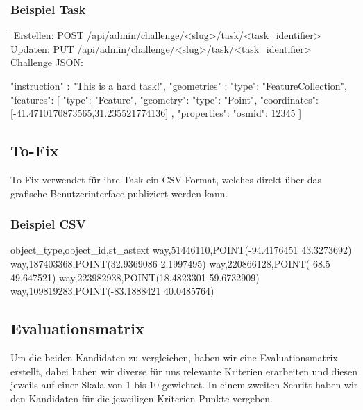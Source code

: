 \subsubsection{Beispiel Task}
\begin{tabbing}
    \hspace*{4cm}\=\hspace*{5cm}\= \kill
    Erstellen: \> POST /api/admin/challenge/<slug>/task/<task\_identifier> \\
    Updaten: \> PUT /api/admin/challenge/<slug>/task/<task\_identifier> \\
    Challenge JSON: \\
\end{tabbing}
\begin{python}
{ 
  "instruction" : "This is a hard task!",
  "geometries" : {
    "type": "FeatureCollection",
    "features": [
      { "type": "Feature",
        "geometry": 
        { "type": "Point", 
          "coordinates":[-41.4710170873565,31.235521774136]
        },
        "properties": {"osmid": 12345}
      }
    ]
  }
}
\end{python}	

\subsection{To-Fix}
To-Fix verwendet für ihre Task ein CSV Format, welches direkt über das grafische Benutzerinterface publiziert werden kann.
\subsubsection{Beispiel CSV}
\begin{python}
object_type,object_id,st_astext
way,51446110,POINT(-94.4176451 43.3273692)
way,187403368,POINT(32.9369086 2.1997495)
way,220866128,POINT(-68.5 49.647521)
way,223982938,POINT(18.4823301 59.6732909)
way,109819283,POINT(-83.1888421 40.0485764)
\end{python}

\newpage

\subsection{Evaluationsmatrix}
Um die beiden Kandidaten zu vergleichen, haben wir eine Evaluationsmatrix erstellt, dabei haben wir diverse für uns relevante Kriterien erarbeiten und diesen jeweils auf einer Skala von 1 bis 10 gewichtet.
In einem zweiten Schritt haben wir den Kandidaten für die jeweiligen Kriterien Punkte vergeben.

